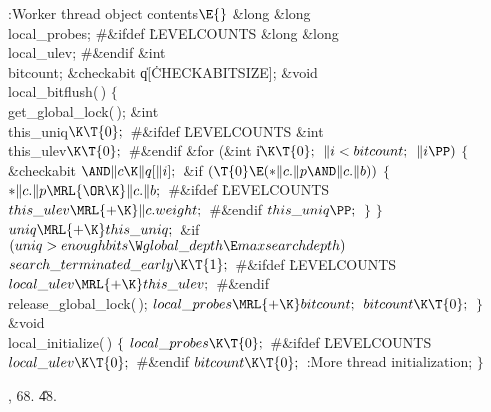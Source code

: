 \Y\B\4:Worker thread object contents\X${}\E{}$\6
\&{long} \&{long} \\{local\_probes};\6
\8\#\&{ifdef} \.{LEVELCOUNTS}\6
\&{long} \&{long} \\{local\_ulev};\6
\8\#\&{endif}\6
\&{int} \\{bitcount};\6
\&{checkabit} \|q[\.{CHECKABITSIZE}];\7
\&{void} \\{local\_bitflush}(\,)\1\1\2\2\6
${}\{{}$\1\6
\\{get\_global\_lock}(\,);\7
\&{int} \\{this\_uniq}${}\K\T{0};{}$\6
\8\#\&{ifdef} \.{LEVELCOUNTS}\6
\&{int} \\{this\_ulev}${}\K\T{0};{}$\6
\8\#\&{endif}\7
\&{for} (\&{int} \|i${}\K\T{0};{}$ ${}\|i<\\{bitcount};{}$ ${}\|i\PP){}$\5
${}\{{}$\1\6
\&{checkabit} ${}{\AND}\|c\K\|q[\|i];{}$\7
\&{if} ${}(\T{0}\E({*}\|c.\|p\AND\|c.\|b)){}$\5
${}\{{}$\1\6
${}{*}\|c.\|p\MRL{{\OR}{\K}}\|c.\|b;{}$\6
\8\#\&{ifdef} \.{LEVELCOUNTS}\6
${}\\{this\_ulev}\MRL{+{\K}}\|c.\\{weight};{}$\6
\8\#\&{endif}\6
${}\\{this\_uniq}\PP;{}$\6
\4${}\}{}$\2\6
\4${}\}{}$\2\6
${}\\{uniq}\MRL{+{\K}}\\{this\_uniq};{}$\6
\&{if} ${}(\\{uniq}>\\{enoughbits}\W\\{global\_depth}\E\\{maxsearchdepth}){}$\1%
\5
${}\\{search\_terminated\_early}\K\T{1};{}$\2\6
\8\#\&{ifdef} \.{LEVELCOUNTS}\6
${}\\{local\_ulev}\MRL{+{\K}}\\{this\_ulev};{}$\6
\8\#\&{endif}\6
\\{release\_global\_lock}(\,);\6
${}\\{local\_probes}\MRL{+{\K}}\\{bitcount};{}$\6
${}\\{bitcount}\K\T{0};{}$\6
\4${}\}{}$\2\7
\&{void} \\{local\_initialize}(\,)\1\1\2\2\6
${}\{{}$\1\6
${}\\{local\_probes}\K\T{0};{}$\6
\8\#\&{ifdef} \.{LEVELCOUNTS}\6
${}\\{local\_ulev}\K\T{0};{}$\6
\8\#\&{endif}\6
${}\\{bitcount}\K\T{0};{}$\6
:More thread initialization\X;\6
\4${}\}{}$\2\par
{}, 68.
\U48.\fi

